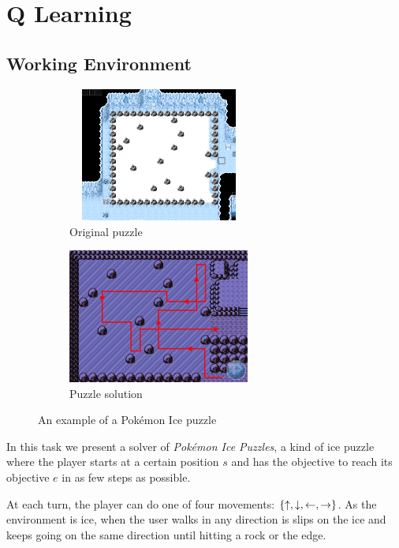 \renewcommand{\thesection}{Basic Task}

\newcommand{\upa}{\mathlarger{\uparrow}}
\newcommand{\downa}{\mathlarger{\downarrow}}
\newcommand{\lefta}{\mathlarger{\leftarrow}}
\newcommand{\righta}{\mathlarger{\rightarrow}}

\section{Q Learning}

\subsection{Working Environment}

\begin{figure}[h]
	\begin{subfigure}{.49\textwidth}
		\centering
		\includegraphics[width=170pt,height=125pt]{snow_original.png}
		\caption{Original puzzle}
	\end{subfigure}
	\begin{subfigure}{.49\textwidth}
		\centering
		\includegraphics[height=125pt]{snow_2.png}
		\caption{Puzzle solution}
	\end{subfigure}
	\caption{An example of a Pokémon Ice puzzle}
	\label{large_map}
\end{figure}

In this task we present a solver of \emph{Pokémon Ice Puzzles}, a kind of ice puzzle where the player starts at a certain position $s$ and has the objective to reach its objective $e$ in as few steps as possible.

At each turn, the player can do one of four movements: $\{\upa, \downa, \lefta, \righta\}$.
As the environment is ice, when the user walks in any direction is slips on the ice and keeps going on the same direction until hitting a rock or the edge.

